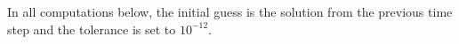 In all computations below, the initial guess is the solution from the previous time step and the tolerance is set to $10^{-12}$.




